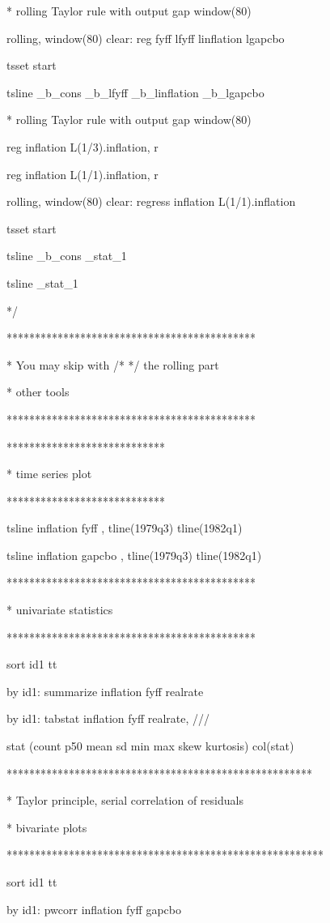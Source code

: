 \documentclass[12pt,a4paper]{article}%
\begin{document}
* rolling Taylor rule with output gap window(80)

rolling, window(80) clear: reg fyff lfyff linflation lgapcbo

tsset start

tsline \_b\_cons \_b\_lfyff \_b\_linflation \_b\_lgapcbo

* rolling Taylor rule with output gap window(80)

reg inflation L(1/3).inflation, r

reg inflation L(1/1).inflation, r

rolling, window(80) clear: regress inflation L(1/1).inflation

tsset start

tsline \_b\_cons \_stat\_1

tsline \_stat\_1

*/

********************************************

* You may skip with /* */ the rolling part

* other tools

********************************************

****************************

* time series plot

****************************

tsline inflation fyff , tline(1979q3) tline(1982q1)

tsline inflation gapcbo , tline(1979q3) tline(1982q1)

********************************************

* univariate statistics

********************************************

sort id1 tt

by id1: summarize inflation fyff realrate

by id1: tabstat inflation fyff realrate, ///

stat (count p50 mean sd min max skew kurtosis) col(stat)

******************************************************

* Taylor principle, serial correlation of residuals

* bivariate plots

********************************************************

sort id1 tt

by id1: pwcorr inflation fyff gapcbo
\end{document}
